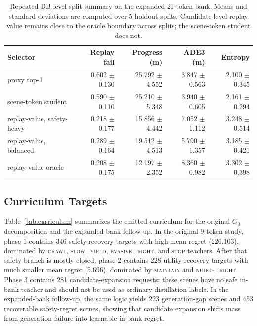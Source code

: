 \documentclass{article}
\newcommand{\token}[1]{\textsc{#1}}
\begin{document}
\begin{table}[t]
\centering
\caption{Repeated DB-level split summary on the expanded 21-token bank. Means and standard
deviations are computed over 5 holdout splits. Candidate-level replay value remains close
to the oracle boundary across splits; the scene-token student does not.}
\label{tab:repeated_splits}
\footnotesize
\begin{tabular}{lrrrr}
\toprule
Selector & Replay fail & Progress (m) & ADE3 (m) & Entropy \\
\midrule
proxy top-1 & 0.602 $\pm$ 0.130 & 25.792 $\pm$ 4.552 & 3.847 $\pm$ 0.563 & 2.100 $\pm$ 0.345 \\
scene-token student & 0.590 $\pm$ 0.110 & 25.210 $\pm$ 5.348 & 3.940 $\pm$ 0.605 & 2.161 $\pm$ 0.294 \\
replay-value, safety-heavy & 0.218 $\pm$ 0.177 & 15.856 $\pm$ 4.442 & 7.052 $\pm$ 1.112 & 3.248 $\pm$ 0.514 \\
replay-value, balanced & 0.289 $\pm$ 0.164 & 19.512 $\pm$ 4.513 & 5.790 $\pm$ 1.357 & 3.185 $\pm$ 0.421 \\
replay-value oracle & 0.208 $\pm$ 0.175 & 12.197 $\pm$ 2.352 & 8.360 $\pm$ 0.982 & 3.302 $\pm$ 0.398 \\
\bottomrule
\end{tabular}
\end{table}

\subsection{Curriculum Targets}
\label{sec:exp:curriculum}

Table~\ref{tab:curriculum} summarizes the emitted curriculum for the original $G_0$
decomposition and the expanded-bank follow-up. In the original 9-token study, phase 1
contains 346 safety-recovery targets with high mean regret (226.103), dominated by
\token{crawl}, \token{slow\_yield}, \token{evasive\_right}, and \token{stop} teachers.
After that safety branch is mostly closed, phase 2 contains 228 utility-recovery targets
with much smaller mean regret (5.696), dominated by \token{maintain} and
\token{nudge\_right}. Phase 3 contains 281 candidate-expansion requests: these scenes
have no safe in-bank teacher and should not be used as ordinary distillation labels. In
the expanded-bank follow-up, the same logic yields 223 generation-gap scenes and 453
recoverable safety-regret scenes, showing that candidate expansion shifts mass from
generation failure into learnable in-bank regret.
\end{document}
